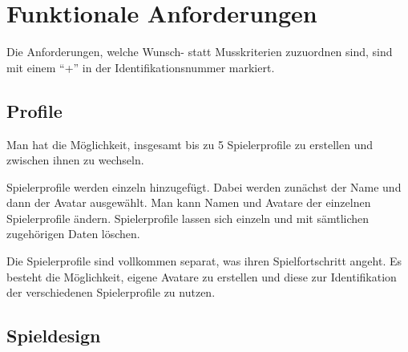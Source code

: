 \section{Funktionale Anforderungen}

Die Anforderungen, welche Wunsch- statt Musskriterien zuzuordnen sind, sind mit einem "`+"' in der Identifikationsnummer markiert.

\subsection{Profile}

\begin{requirements}
	Man hat die Möglichkeit, insgesamt bis zu 5 Spielerprofile zu erstellen und zwischen ihnen zu wechseln.
	\begin{requirements}
		 Spielerprofile werden einzeln hinzugefügt. Dabei werden zunächst der Name und dann der Avatar ausgewählt.
		 Man kann Namen und Avatare der einzelnen Spielerprofile ändern.
		 Spielerprofile lassen sich einzeln und mit sämtlichen zugehörigen Daten löschen.
	\end{requirements}
	Die Spielerprofile sind vollkommen separat, was ihren Spielfortschritt angeht.
	Es besteht die Möglichkeit, eigene Avatare zu erstellen und diese zur Identifikation der verschiedenen Spielerprofile zu nutzen.
\end{requirements}

\subsection{Spieldesign}

